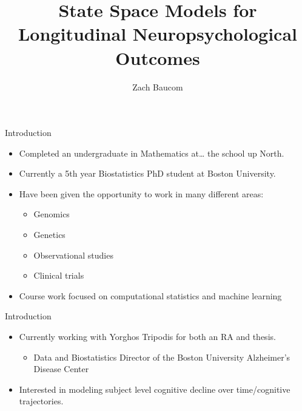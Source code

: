 \documentclass[
  ignorenonframetext,
]{beamer}
\title{State Space Models for Longitudinal Neuropsychological Outcomes}
\author{Zach Baucom}
\date{}
\providecommand{\tightlist}{%
  \setlength{\itemsep}{0pt}\setlength{\parskip}{0pt}}
\begin{document}
\frame{\titlepage}

\begin{frame}{Introduction}
\protect\hypertarget{introduction}{}
\begin{itemize}
\tightlist
\item
  Completed an undergraduate in Mathematics at\ldots{} the school up
  North.
\item
  Currently a 5th year Biostatistics PhD student at Boston University.
\item
  Have been given the opportunity to work in many different areas:

  \begin{itemize}
  \tightlist
  \item
    Genomics
  \item
    Genetics
  \item
    Observational studies
  \item
    Clinical trials
  \end{itemize}
\item
  Course work focused on computational statistics and machine learning
\end{itemize}
\end{frame}

\begin{frame}{Introduction}
\protect\hypertarget{introduction-1}{}
\begin{itemize}
\tightlist
\item
  Currently working with Yorghos Tripodis for both an RA and thesis.

  \begin{itemize}
  \tightlist
  \item
    Data and Biostatistics Director of the Boston University Alzheimer's
    Disease Center
  \end{itemize}
\item
  Interested in modeling subject level cognitive decline over
  time/cognitive trajectories.
\end{itemize}
\end{frame}
\end{document}
